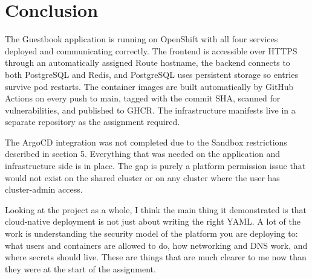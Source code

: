 \section{Conclusion}

The Guestbook application is running on OpenShift with all four services deployed and
communicating correctly. The frontend is accessible over HTTPS through an automatically
assigned Route hostname, the backend connects to both PostgreSQL and Redis, and
PostgreSQL uses persistent storage so entries survive pod restarts. The container images
are built automatically by GitHub Actions on every push to main, tagged with the commit
SHA, scanned for vulnerabilities, and published to GHCR. The infrastructure manifests
live in a separate repository as the assignment required.

The ArgoCD integration was not completed due to the Sandbox restrictions described in
section 5. Everything that was needed on the application and infrastructure side is in
place. The gap is purely a platform permission issue that would not exist on the shared
cluster or on any cluster where the user has cluster-admin access.

Looking at the project as a whole, I think the main thing it demonstrated is that
cloud-native deployment is not just about writing the right YAML. A lot of the work is
understanding the security model of the platform you are deploying to: what users and
containers are allowed to do, how networking and DNS work, and where secrets should live.
These are things that are much clearer to me now than they were at the start of the
assignment.
